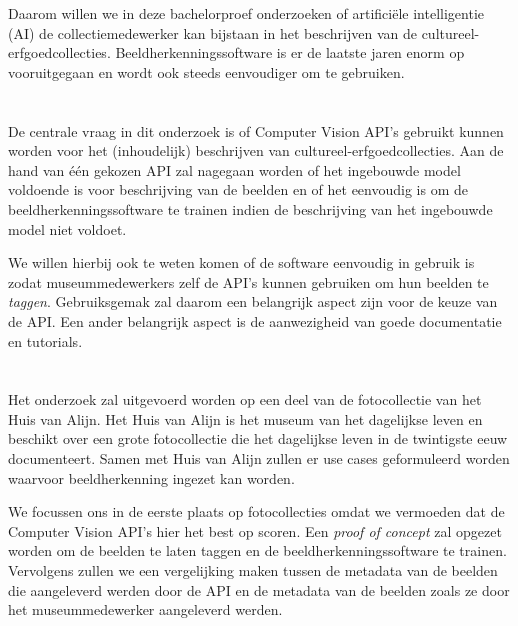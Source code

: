 Daarom willen we in deze bachelorproef onderzoeken of artificiële intelligentie (AI) de collectiemedewerker kan bijstaan in het beschrijven van de cultureel-erfgoedcollecties. Beeldherkenningssoftware is er de laatste jaren enorm op vooruitgegaan en wordt ook steeds eenvoudiger om te gebruiken.

\section{}
\label{sec:onderzoeksvraag}

De centrale vraag in dit onderzoek is of Computer Vision API’s gebruikt kunnen worden voor het (inhoudelijk) beschrijven van cultureel-erfgoedcollecties. Aan de hand van één gekozen API zal nagegaan worden of het ingebouwde model voldoende is voor beschrijving van de beelden en of het eenvoudig is om de beeldherkenningssoftware te trainen indien de beschrijving van het ingebouwde model niet voldoet. 

We willen hierbij ook te weten komen of de software eenvoudig in gebruik is zodat museummedewerkers zelf de API’s kunnen gebruiken om hun beelden te \textit{taggen}. Gebruiksgemak zal daarom een belangrijk aspect zijn voor de keuze van de API. Een ander belangrijk aspect is de aanwezigheid van goede documentatie en tutorials.

\section{}
\label{sec:onderzoeksdoelstelling}

Het onderzoek zal uitgevoerd worden op een deel van de fotocollectie van het Huis van Alijn. Het Huis van Alijn is het museum van het dagelijkse leven en beschikt over een grote fotocollectie die het dagelijkse leven in de twintigste eeuw documenteert. Samen met Huis van Alijn zullen er use cases geformuleerd worden waarvoor beeldherkenning ingezet kan worden.

We focussen ons in de eerste plaats op fotocollecties omdat we vermoeden dat de Computer Vision API’s hier het best op scoren. Een \textit{proof of concept} zal opgezet worden om de beelden te laten taggen en de beeldherkenningssoftware te trainen. Vervolgens zullen we een vergelijking maken tussen de metadata van de beelden die aangeleverd werden door de API en de metadata van de beelden zoals ze door het museummedewerker aangeleverd werden.

